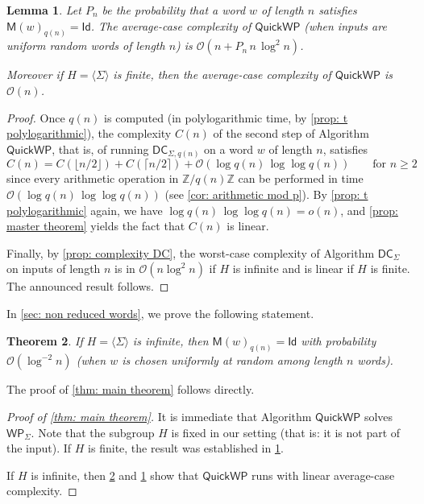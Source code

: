 \documentclass{article}
\def\Id{\textsf{Id}}
\def\O{\mathcal{O}}
\def\Z{\mathbb{Z}}
\let\ZZ = \Z
\def\DC{\textsf{DC}}
\def\WP{\textsf{WP}}
\def\S{\textsf{QuickWP}}
\def\mat{\textsf{M}}
\theoremstyle{plain}
\newtheorem{theorem}{Theorem}
\newtheorem{lemma}[theorem]{Lemma}
\theoremstyle{definition}
\begin{document}
\begin{lemma}\label{lemma: ac of DCm}
%
Let $P_n$ be the probability that a word $w$ of length $n$ satisfies $\mat(w)_{q(n)} = \Id$. The aver\-age-case complexity of $\S$ (when inputs are uniform random words of length $n$) is $\O(n + P_n\, n\, \log^2n)$.

Moreover if $H = \langle\Sigma\rangle$ is finite, then the average-case complexity of $\S$ is $\O(n)$.
%
\end{lemma}

\begin{proof}
    Once $q(n)$ is computed (in polylogarithmic time, by \cref{prop: t polylogarithmic}), the complexity $C(n)$ of the second step of Algorithm $\S$, that is, of running $\DC_{\Sigma,q(n)}$ on a word $w$ of length $n$, satisfies
    $$C(n) = C\left(\lfloor n/2\rfloor\right) + C\left(\lceil n/2\rceil\right) + \O(\log q(n)\,\log\log q(n))\qquad \text{for } n\geq 2$$
    since every arithmetic operation in $\ZZ/q(n)\ZZ$ can be performed in time $\O(\log q(n)\, \log\log q(n))$ (see \cref{cor: arithmetic mod p}). By \cref{prop: t polylogarithmic} again, we have $\log q(n)\,\log\log q(n) =o(n)$, and 
    \cref{prop: master theorem} yields the fact that $C(n)$ is linear.
    
    Finally, by \cref{prop: complexity DC}, the worst-case complexity of Algorithm $\DC_{\Sigma}$ on inputs of length $n$ is in $\O(n\log^2 n)$ if $H$ is infinite and is linear if $H$ is finite.
    The announced result follows.
%
\end{proof}


In \cref{sec: non reduced words}, we prove the following statement.

\begin{theorem}\label{thm: technical theorem}
    If $H = \langle\Sigma\rangle$ is infinite, then $\mat(w)_{q(n)} = \Id$ with probability $\O(\log^{-2} n)$ (when $w$ is chosen uniformly at random among length $n$ words).
\end{theorem}

The proof of \cref{thm: main theorem} follows directly.

\begin{proof}[Proof of \cref{thm: main theorem}]
    It is immediate that Algorithm $\S$ solves $\WP_\Sigma$. Note that the subgroup $H$ is fixed in our setting (that is: it is not part of the input). If $H$ is finite, the result was established in \cref{lemma: ac of DCm}.
    
    If $H$ is infinite, then \cref{thm: technical theorem} and \cref{lemma: ac of DCm} show that $\S$ runs with linear average-case complexity.
\end{proof}
\end{document}
